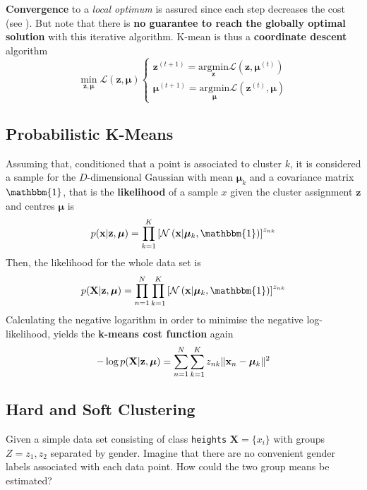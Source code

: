 \documentclass[11pt]{article}
\theoremstyle{definition}
\newcommand*\N[1]{\mathcal{N}\left(#1\right)}
\newcommand*\Likelihood{\mathcal{L}}
\newcommand*\argmin[1]{\underset{#1}{\text{argmin}}}
\newcommand*\isocov{\ensuremath{\mathbbm{1}}}
\DeclarePairedDelimiter\norm{\lVert}{\rVert}
\begin{document}
\textbf{Convergence} to a \emph{local optimum} is assured since each step decreases the cost (see \cite[Exercise 9.1]{bishop2006pattern}). But note that there is \textbf{no guarantee to reach the globally optimal solution} with this iterative algorithm. K-mean is thus a \textbf{coordinate descent} algorithm
\begin{equation*}
	\underset{\textbf{z},\bm{\mu}}{\min} \Likelihood(\textbf{z},\bm{\mu}) \begin{cases}
	\textbf{z}^{(t+1)} = \argmin{\textbf{z}} \Likelihood(\textbf{z},\bm{\mu}^{(t)})\\
	\bm{\mu}^{(t+1)} = \argmin{\bm{\mu}} \Likelihood(\textbf{z}^{(t)},\bm{\mu})
	\end{cases}
\end{equation*}

\subsection{Probabilistic K-Means}
Assuming that, conditioned that a point is associated to cluster $k$, it is considered a sample for the $D$-dimensional Gaussian with mean $\bm{\mu}_k$ and a covariance matrix $\isocov$, that is the \textbf{likelihood} of a sample $x$ given the cluster assignment $\textbf{z}$ and centres $\bm{\mu}$ is
\begin{equation*}
	p(\textbf{x}|\textbf{z},\bm{\mu}) = \prod_{k=1}^{K}\left[\N{\textbf{x}\middle| \bm{\mu}_k,\isocov}\right]^{z_{nk}}
\end{equation*}
Then, the likelihood for the whole data set is
\begin{equation*}
	p(\textbf{X}|\textbf{z},\bm{\mu}) = \prod_{n=1}^{N}\prod_{k=1}^{K}\left[\N{\textbf{x}\middle| \bm{\mu}_k,\isocov}\right]^{z_{nk}}
\end{equation*}
Calculating the negative logarithm in order to minimise the negative log-likelihood, yields the \textbf{k-means cost function} again
\begin{equation*}
	-\log p(\textbf{X}|\textbf{z},\bm{\mu}) = \sum_{n=1}^{N}\sum_{k=1}^{K}z_{nk}\norm{\textbf{x}_n - \bm{\mu}_k}^2
\end{equation*}

\subsection{Hard and Soft Clustering}
Given a simple data set consisting of class \texttt{heights} $\textbf{X} = \{x_i\}$ with groups $Z = {z_1,z_2}$ separated by gender. Imagine that there are no convenient gender labels associated with each data point. How could the two group means be estimated?
\end{document}
